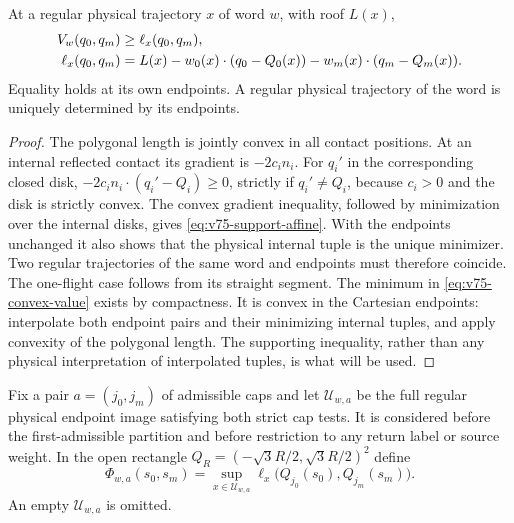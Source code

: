 \begin{lemma}
\label{lem:v75-support}
At a regular physical trajectory $x$ of word $w$, with roof $L(x)$,
\begin{align}
 V_w(q_0,q_m)&\ge \ell_x(q_0,q_m),\notag\\
 \ell_x(q_0,q_m)&=L(x)-w_0(x)\cdot(q_0-Q_0(x))
                         -w_m(x)\cdot(q_m-Q_m(x)).
                                      \label{eq:v75-support-affine}
\end{align}
Equality holds at its own endpoints. A regular physical trajectory
of the word is uniquely determined by its endpoints.
\end{lemma}
\begin{proof}
The polygonal length is jointly convex in all contact positions.
At an internal reflected contact its gradient is $-2c_i n_i$.
For $q_i'$ in the corresponding closed disk,
$-2c_i n_i\cdot(q_i'-Q_i)\ge0$, strictly if $q_i'\ne Q_i$,
because $c_i>0$ and the disk is strictly convex. The convex gradient
inequality, followed by minimization over the internal disks, gives
\eqref{eq:v75-support-affine}. With the endpoints unchanged it also
shows that the physical internal tuple is the unique minimizer.
Two regular trajectories of the same word and endpoints must therefore
coincide. The one-flight case follows from its straight segment.
The minimum in \eqref{eq:v75-convex-value} exists by compactness.
It is convex in the Cartesian endpoints: interpolate both endpoint
pairs and their minimizing internal tuples, and apply convexity of
the polygonal length. The supporting inequality, rather than any
physical interpretation of interpolated tuples, is what will be used.
\end{proof}

Fix a pair $a=(j_0,j_m)$ of admissible caps and let $\mathcal U_{w,a}$
be the full regular physical endpoint image satisfying both strict
cap tests. It is considered before the first-admissible partition
and before restriction to any return label or source weight. In the
open rectangle $Q_R=(-\sqrt3R/2,\sqrt3R/2)^2$ define
\begin{equation}\label{eq:v75-support-envelope}
 \Phi_{w,a}(s_0,s_m)=
 \sup_{x\in\mathcal U_{w,a}}
             \ell_x\bigl(Q_{j_0}(s_0),Q_{j_m}(s_m)\bigr).
\end{equation}
An empty $\mathcal U_{w,a}$ is omitted.

